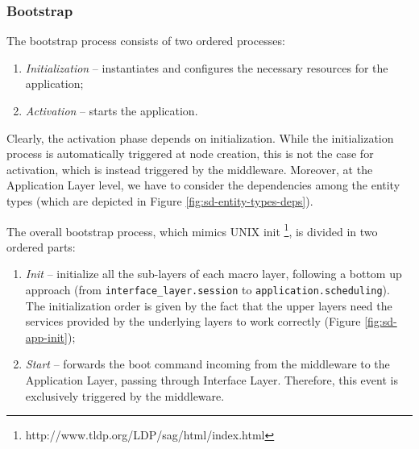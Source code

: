 \subsubsection{Bootstrap}

The bootstrap process consists of two ordered processes:

\begin{enumerate}
  \item \textit{Initialization} -- instantiates and configures the necessary
    resources for the application;
  \item \textit{Activation} -- starts the application.
\end{enumerate}

Clearly, the activation phase depends on initialization.
While the initialization process is automatically triggered at node creation,
this is not the case for activation, which is instead triggered by the
middleware.
Moreover, at the Application Layer level, we have to consider the dependencies
among the entity types (which are depicted in Figure
\ref{fig:sd-entity-types-deps}).

The overall bootstrap process, which mimics UNIX init
\footnote{http://www.tldp.org/LDP/sag/html/index.html},
is divided in two ordered parts:
\begin{enumerate}
  \item \textit{Init} -- initialize all the sub-layers of each macro layer,
  following a bottom up approach (from \verb|interface_layer.session| to
  \verb|application.scheduling|).
  The initialization order is given by the fact that the upper
  layers need the services provided by the underlying layers to work
  correctly (Figure \ref{fig:sd-app-init});
  \item \textit{Start} -- forwards the boot command incoming from the
  middleware to the Application Layer, passing through Interface Layer.
  Therefore, this event is exclusively triggered by the middleware.
\end{enumerate}

